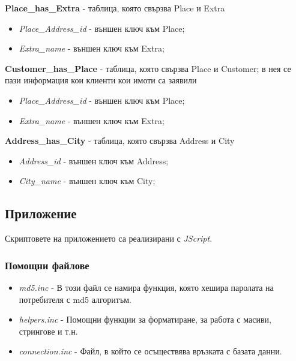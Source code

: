 \documentclass[a4paper,12pt, leqno]{article}
\begin{document}
\textbf{Place\_has\_Extra} - таблица, която свързва Place и Extra
\begin{itemize}
 \item \textit{Place\_Address\_id} - външен ключ към Place;
 \item \textit{Extra\_name} - външен ключ към Extra;
\end{itemize}

\textbf{Customer\_has\_Place} - таблица, която свързва Place и Customer; в нея се пази информация 
кои клиенти кои имоти са заявили
\begin{itemize}
 \item \textit{Place\_Address\_id} - външен ключ към Place;
 \item \textit{Extra\_name} - външен ключ към Extra;
\end{itemize}

\textbf{Address\_has\_City} - таблица, която свързва Address и City
\begin{itemize}
 \item \textit{Address\_id} - външен ключ към Address;
 \item \textit{City\_name} - външен ключ към City;
\end{itemize}



\subsection{Приложение}
Скриптовете на приложението са реализирани с \textit{JScript}.
\subsubsection{Помощни файлове}
\begin{itemize}
 \item \textit{md5.inc} - В този файл се намира функция, която хешира паролата на потребителя с md5 алгоритъм.
 \item \textit{helpers.inc} - Помощни функции за форматиране, за работа с масиви, стрингове и т.н.
 \item \textit{connection.inc} - Файл, в който се осъществява връзката с базата данни.
\end{itemize}
\end{document}
